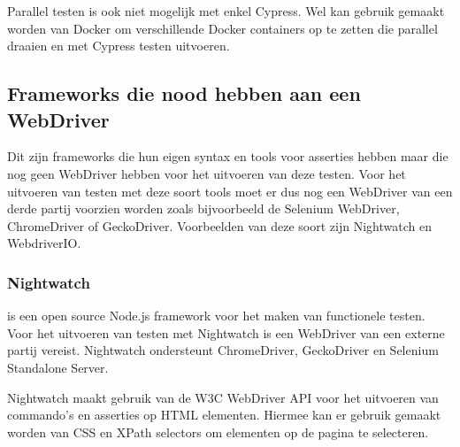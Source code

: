Parallel testen is ook niet mogelijk met enkel Cypress. Wel kan gebruik gemaakt worden van Docker om verschillende Docker containers op te zetten die parallel draaien en met Cypress testen uitvoeren.

\subsection{Frameworks die nood hebben aan een WebDriver}

Dit zijn \glspl{framework} die hun eigen syntax en \glspl{tool} voor \glspl{assertie} hebben maar die nog geen \gls{WebDriver} hebben voor het uitvoeren van deze testen. Voor het uitvoeren van testen met deze soort \glspl{tool} moet er dus nog een \gls{WebDriver} van een derde partij voorzien worden zoals bijvoorbeeld de Selenium \gls{WebDriver}, ChromeDriver of GeckoDriver. Voorbeelden van deze soort zijn Nightwatch en WebdriverIO.

\subsubsection{Nightwatch}

\textcite{Nightwatch} is een open source Node.js \gls{framework} voor het maken van functionele testen. Voor het uitvoeren van testen met Nightwatch is een \gls{WebDriver} van een externe partij vereist. Nightwatch ondersteunt ChromeDriver, GeckoDriver en Selenium Standalone Server.

Nightwatch maakt gebruik van de W3C \gls{WebDriver} \gls{API} voor het uitvoeren van commando's en \glspl{assertie} op \gls{HTML} elementen. Hiermee kan er gebruik gemaakt worden van \gls{CSS} en \gls{XPath} selectors om elementen op de pagina te selecteren.

